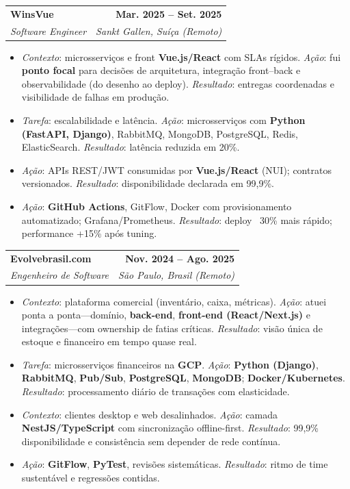 \documentclass[letterpaper,11pt]{article}
\makeatletter
\newcommand{\resumeItem}[1]{
  \item\small{
    {#1 \vspace{-2pt}}
  }
}
\newcommand{\resumeSubheading}[4]{
  \vspace{-2pt}\item
    \begin{tabular*}{1.0\textwidth}[t]{l@{\extracolsep{\fill}}r}
      \textbf{#1} & \textbf{\small #2} \\
      \textit{\small#3} & \textit{\small #4} \\
    \end{tabular*}\vspace{-7pt}
}
\newcommand{\resumeItemListStart}{\begin{itemize}}
\newcommand{\resumeItemListEnd}{\end{itemize}\vspace{-5pt}}
\makeatother
\begin{document}
    \resumeSubheading
      {WinsVue}{Mar. 2025 -- Set. 2025}
      {Software Engineer}{Sankt Gallen, Suíça (Remoto)}
      \resumeItemListStart
        \resumeItem{\textit{Contexto}: microsserviços e front \textbf{Vue.js/React} com SLAs rígidos. \textit{Ação}: fui \textbf{ponto focal} para decisões de arquitetura, integração front--back e observabilidade (do desenho ao deploy). \textit{Resultado}: entregas coordenadas e visibilidade de falhas em produção.}
        \resumeItem{\textit{Tarefa}: escalabilidade e latência. \textit{Ação}: microsserviços com \textbf{Python (FastAPI, Django)}, RabbitMQ, MongoDB, PostgreSQL, Redis, ElasticSearch. \textit{Resultado}: latência reduzida em 20\%.}
        \resumeItem{\textit{Ação}: APIs REST/JWT consumidas por \textbf{Vue.js/React} (NUI); contratos versionados. \textit{Resultado}: disponibilidade declarada em 99,9\%.}
        \resumeItem{\textit{Ação}: \textbf{GitHub Actions}, GitFlow, Docker com provisionamento automatizado; Grafana/Prometheus. \textit{Resultado}: deploy ~30\% mais rápido; performance +15\% após tuning.}
      \resumeItemListEnd

    \resumeSubheading
      {Evolvebrasil.com}{Nov. 2024 -- Ago. 2025}
      {Engenheiro de Software}{São Paulo, Brasil (Remoto)}
      \resumeItemListStart
        \resumeItem{\textit{Contexto}: plataforma comercial (inventário, caixa, métricas). \textit{Ação}: atuei ponta a ponta---domínio, \textbf{back-end}, \textbf{front-end (React/Next.js)} e integrações---com ownership de fatias críticas. \textit{Resultado}: visão única de estoque e financeiro em tempo quase real.}
        \resumeItem{\textit{Tarefa}: microsserviços financeiros na \textbf{GCP}. \textit{Ação}: \textbf{Python (Django)}, \textbf{RabbitMQ}, \textbf{Pub/Sub}, \textbf{PostgreSQL}, \textbf{MongoDB}; \textbf{Docker/Kubernetes}. \textit{Resultado}: processamento diário de transações com elasticidade.}
        \resumeItem{\textit{Contexto}: clientes desktop e web desalinhados. \textit{Ação}: camada \textbf{NestJS/TypeScript} com sincronização offline-first. \textit{Resultado}: 99,9\% disponibilidade e consistência sem depender de rede contínua.}
        \resumeItem{\textit{Ação}: \textbf{GitFlow}, \textbf{PyTest}, revisões sistemáticas. \textit{Resultado}: ritmo de time sustentável e regressões contidas.}
      \resumeItemListEnd
\end{document}
